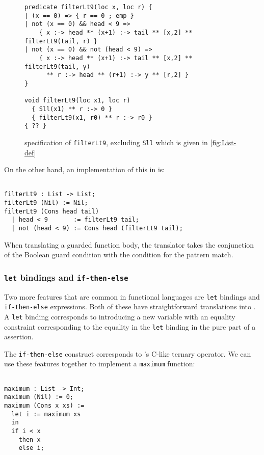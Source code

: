 \begin{figure}
  \begin{lstlisting}[language=SynLang]
predicate filterLt9(loc x, loc r) {
| (x == 0) => { r == 0 ; emp }
| not (x == 0) && head < 9 =>
    { x :-> head ** (x+1) :-> tail ** [x,2] ** filterLt9(tail, r) }
| not (x == 0) && not (head < 9) =>
    { x :-> head ** (x+1) :-> tail ** [x,2] ** filterLt9(tail, y)
      ** r :-> head ** (r+1) :-> y ** [r,2] }
}

void filterLt9(loc x1, loc r)
  { Sll(x1) ** r :-> 0 }
  { filterLt9(x1, r0) ** r :-> r0 }
{ ?? }
  \end{lstlisting}
  \caption{\SuSLik{} specification of \lstinline{filterLt9}, excluding \lstinline{Sll} which is given in \autoref{fig:List-def}}
  \label{fig:suslik-filter}
\end{figure}

On the other hand, an implementation of this in \Pika{} is:

\begin{lstlisting}[language=Pika]
%generate filterLt9 [Sll] Sll

filterLt9 : List -> List;
filterLt9 (Nil) := Nil;
filterLt9 (Cons head tail)
  | head < 9       := filterLt9 tail;
  | not (head < 9) := Cons head (filterLt9 tail);
\end{lstlisting}

\noindent
When translating a guarded function body, the translator takes the conjunction of the Boolean guard condition with
the condition for the pattern match.

\subsubsection{\texttt{let} bindings and \texttt{if-then-else}}

Two more features that are common in functional languages are \verb|let| bindings and
\verb|if-then-else| expressions. Both of these have straightforward translations into
\SuSLik. A \verb|let| binding corresponds to introducing a new variable with an equality
constraint corresponding to the equality in the \verb|let| binding in the pure part of a \SuSLik{} assertion.

The \verb|if-then-else| construct corresponds to \SuSLik's C-like ternary operator. We can use these features together to implement a \verb|maximum| function:

\begin{lstlisting}[language=Pika]
%generate maximum [Sll] Int

maximum : List -> Int;
maximum (Nil) := 0;
maximum (Cons x xs) :=
  let i := maximum xs
  in
  if i < x
    then x
    else i;
\end{lstlisting}


